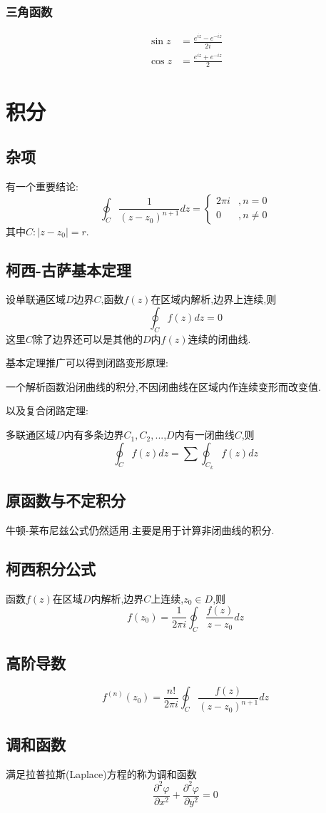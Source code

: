 \documentclass[12pt, a4paper, oneside]{ctexart}
\begin{document}
\subsubsection{三角函数}
\begin{align*}
    \sin z &= \frac{e^{iz}-e^{-iz}}{2i}\\
    \cos z &= \frac{e^{iz}+e^{-iz}}{2}
\end{align*}
\section{积分}
\subsection{杂项}
有一个重要结论:
\[
    \oint_C \frac{1}{(z-z_0)^{n+1}}dz = \begin{cases}
        2\pi i &,n=0\\
        0 &,n\ne 0
    \end{cases}
\]
其中$C:|z-z_0|=r$.
\subsection{柯西-古萨基本定理}
设单联通区域$D$边界$C$,函数$f(z)$在区域内解析,边界上连续,则
\[
    \oint_C f(z)dz = 0
\]
这里$C$除了边界还可以是其他的$D$内$f(z)$连续的闭曲线.

基本定理推广可以得到闭路变形原理:

一个解析函数沿闭曲线的积分,不因闭曲线在区域内作连续变形而改变值.

以及复合闭路定理:

多联通区域$D$内有多条边界$C_1,C_2,...$,$D$内有一闭曲线$C$,则
\[
    \oint_C f(z)dz = \sum \oint_{C_k}f(z)dz
\]
\subsection{原函数与不定积分}
牛顿-莱布尼兹公式仍然适用.主要是用于计算非闭曲线的积分.
\subsection{柯西积分公式}
函数$f(z)$在区域$D$内解析,边界$C$上连续,$z_0 \in D$,则
\[
    f(z_0) = \frac{1}{2\pi i}\oint_C \frac{f(z)}{z-z_0}dz
\]
\subsection{高阶导数}
$$
    f^{(n)}(z_0) = \frac{n!}{2\pi i}\oint_C\frac{f(z)}{(z-z_0)^{n+1}}dz
$$
\subsection{调和函数}
满足拉普拉斯(Laplace)方程的称为调和函数
$$
    \frac{\partial^2 \varphi}{\partial x^2} + \frac{\partial^2 \varphi}{\partial y^2} = 0
$$
\end{document}
